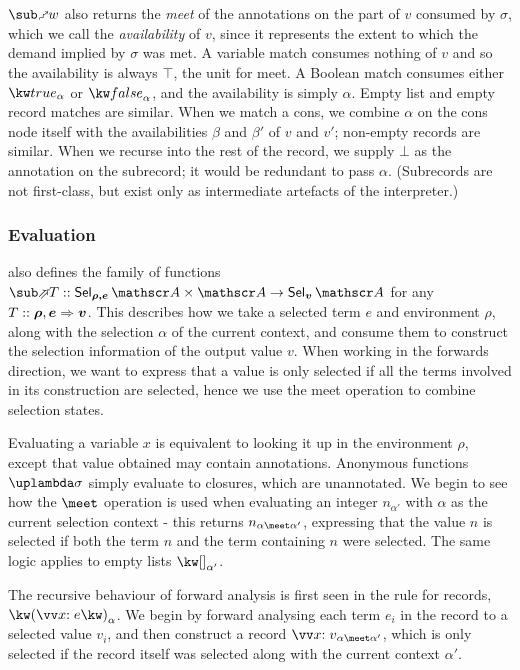$\matchFwdF{w}$ also returns the \emph{meet} of the annotations on the part of $v$ consumed by $\sigma$, which we call the \emph{availability} of $v$, since it represents the extent to which the demand implied by $\sigma$ was met. A variable match consumes nothing of $v$ and so the availability is always $\top$, the unit for meet. A Boolean match consumes either $\annot{\exTrue}{\alpha}$ or $\annot{\exFalse}{\alpha}$, and the availability is simply $\alpha$. Empty list and empty record matches are similar. When we match a cons, we combine $\alpha$ on the cons node itself with the availabilities $\beta$ and $\beta'$ of $v$ and $v'$; non-empty records are similar. When we recurse into the rest of the record, we supply $\bot$ as the annotation on the subrecord; it would be redundant to pass $\alpha$. (Subrecords are not first-class, but exist only as intermediate artefacts of the interpreter.)

\subsubsection{Evaluation}

 also defines the family of functions $\evalFwdF{T} :: \Prod{\Sel{\rho, e}{A}}{\Ann{A}} \to \Sel{v}{A}$ for any $T :: \bm{\rho}, \bm{e} \Rightarrow \bm{v}$. This describes how we take a selected term $e$ and environment $\rho$, along with the selection $\alpha$ of the current context, and consume them to construct the selection information of the output value $v$. When working in the forwards direction, we want to express that a value is only selected if all the terms involved in its construction are selected, hence we use the meet operation to combine selection states.

Evaluating a variable $x$ is equivalent to looking it up in the environment $\rho$, except that value obtained may contain annotations. Anonymous functions $\exLambda{\sigma}$ simply evaluate to closures, which are unannotated. We begin to see how the $\meet$ operation is used when evaluating an integer $n_{\alpha'}$ with $\alpha$ as the current selection context - this returns $\annot{n}{\alpha \meet \alpha'}$, expressing that the value $n$ is selected if both the term $n$ and the term containing $n$ were selected. The same logic applies to empty lists $\annot{\exNil}{\alpha'}$.

The recursive behaviour of forward analysis is first seen in the rule for records, $\exRec{\vec{\bind{x}{e}}}_{\alpha}$. We begin by forward analysing each term $e_i$ in the record to a selected value $v_i$, and then construct a record $\annot{\vec{\bind{x}{v}}}{\alpha \meet \alpha'}$, which is only selected if the record itself was selected along with the current context $\alpha'$.

